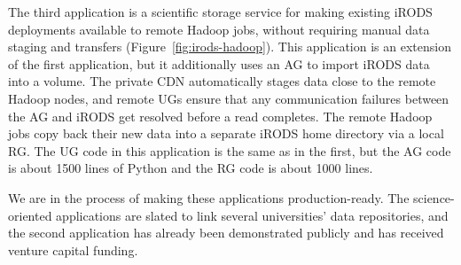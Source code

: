 The third application is a scientific storage service for making existing iRODS
deployments available to remote Hadoop jobs, without requiring manual data
staging and transfers (Figure~\ref{fig:irods-hadoop}). This application is an extension of the first application,
but it additionally uses an AG to import iRODS data into a volume. The private
CDN automatically stages data close to the remote Hadoop nodes, and remote UGs
ensure that any communication failures between the AG and iRODS get resolved
before a read completes. The remote Hadoop jobs copy back their new data into a
separate iRODS home directory via a local RG. The UG code in this application is
the same as in the first, but the AG code is about 1500 lines of Python and the RG
code is about 1000 lines.

We are in the process of making these applications production-ready.  The
science-oriented applications are slated to link several universities' data repositories, and
the second application has already been demonstrated publicly and has received venture capital funding.


